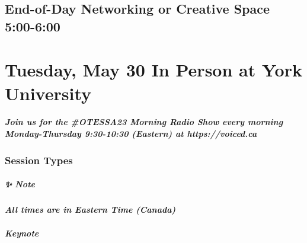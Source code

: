\documentclass[
]{book}
\begin{document}
\hypertarget{end-of-day-networking-or-creative-space-500-600}{%
\section*{End-of-Day Networking or Creative Space \textbar{} 5:00-6:00}\label{end-of-day-networking-or-creative-space-500-600}}

\hypertarget{tuesday-may-30-in-person-at-york-university}{%
\chapter{Tuesday, May 30 \textbar{} In Person at York University}\label{tuesday-may-30-in-person-at-york-university}}

\begin{protip}
\hypertarget{join-us-for-the-otessa23-morning-radio-show-every-morning-monday-thursday-930-1030-eastern-at-httpsvoiced.ca}{%
\paragraph{Join us for the \#OTESSA23 Morning Radio Show every morning
Monday-Thursday 9:30-10:30 (Eastern) at
https://voiced.ca}\label{join-us-for-the-otessa23-morning-radio-show-every-morning-monday-thursday-930-1030-eastern-at-httpsvoiced.ca}}
\end{protip}

\hypertarget{session-types-2}{%
\subsection*{Session Types}\label{session-types-2}}

\begin{protip}
\hypertarget{note}{%
\paragraph*{✨ Note}\label{note}}

\textbf{\emph{All times are in Eastern Time (Canada)}}
\end{protip}

\begin{keynote}
\hypertarget{keynote}{%
\paragraph{Keynote}\label{keynote}}
\end{keynote}
\end{document}
